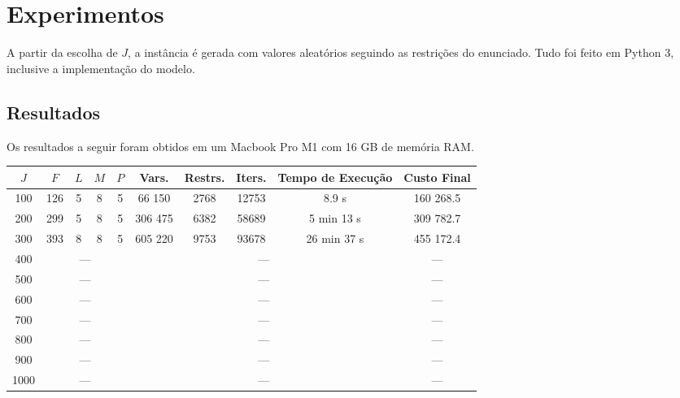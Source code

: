 \section{Experimentos}

    A partir da escolha de $J$, a instância é gerada com valores aleatórios seguindo as restrições do enunciado. Tudo foi feito em Python 3, inclusive a implementação do modelo.

    \subsection{Resultados}

        Os resultados a seguir foram obtidos em um Macbook Pro M1 com 16 GB de memória RAM.

        \begin{table}[H]
            \centering
            \begin{tabular}{ccccc|cccc|c}
                \toprule\toprule
                $J$ & $F$ & $L$ & $M$ & $P$ & Vars. & Restrs. & Iters. & Tempo de Execução & Custo Final \\
                \midrule
                100 & 126 & 5 & 8 & 5 & 66 150 & 2768 & 12753 & 8.9 s & 160 268.5 \\
                200 & 299 & 5 & 8 & 5 & 306 475 & 6382 & 58689 & 5 min 13 s & 309 782.7 \\
                300 & 393 & 8 & 8 & 5 & 605 220 & 9753 & 93678 & 26 min 37 s & 455 172.4 \\
                400 & \multicolumn{4}{c|}{---} & \multicolumn{4}{c|}{---} & --- \\
                500 & \multicolumn{4}{c|}{---} & \multicolumn{4}{c|}{---} & --- \\
                600 & \multicolumn{4}{c|}{---} & \multicolumn{4}{c|}{---} & --- \\
                700 & \multicolumn{4}{c|}{---} & \multicolumn{4}{c|}{---} & --- \\
                800 & \multicolumn{4}{c|}{---} & \multicolumn{4}{c|}{---} & --- \\
                900 & \multicolumn{4}{c|}{---} & \multicolumn{4}{c|}{---} & --- \\
                1000 & \multicolumn{4}{c|}{---} & \multicolumn{4}{c|}{---} & --- \\
                \bottomrule\bottomrule
            \end{tabular}
        \end{table}
